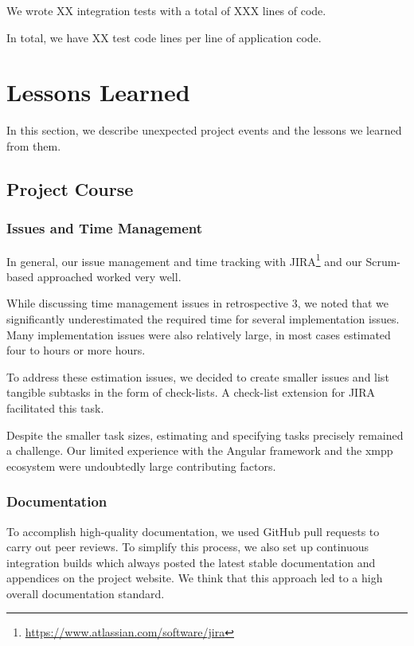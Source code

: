 We wrote XX integration tests with a total of XXX lines of code. %

In total, we have XX test code lines per line of application code.  %


\section{Lessons Learned}

In this section, we describe unexpected project events and the lessons we learned from them.

\subsection{Project Course}

\subsubsection{Issues and Time Management}

In general, our issue management and time tracking with JIRA\footnote{\url{https://www.atlassian.com/software/jira}} and our Scrum-based approached worked very well.

While discussing time management issues in retrospective 3, we noted that we significantly underestimated the required time for several implementation issues.
Many implementation issues were also relatively large, in most cases estimated four to hours or more hours.

To address these estimation issues, we decided to create smaller issues and list tangible subtasks in the form of check-lists.
A check-list extension for JIRA facilitated this task.

Despite the smaller task sizes, estimating and specifying tasks precisely remained a challenge.
Our limited experience with the Angular framework and the \gls{xmpp} ecosystem were undoubtedly large contributing factors.

\subsubsection{Documentation}

To accomplish high-quality documentation, we used GitHub pull requests to carry out peer reviews.
To simplify this process, we also set up continuous integration builds which always posted the latest stable documentation and appendices on the project website.
We think that this approach led to a high overall documentation standard.

